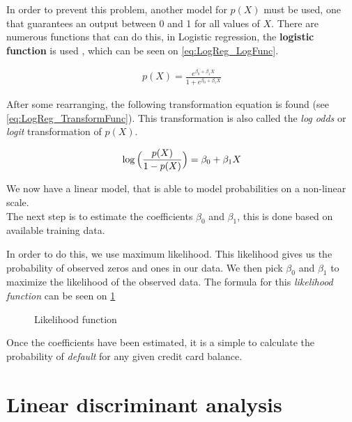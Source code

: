 In order to prevent this problem, another model for $p(X)$ must be used, one that guarantees an output between 0 and 1 for all values of $X$. There are numerous functions that can do this, in Logistic regression, the \textbf{logistic function} is used , which can be seen on \cref{eq:LogReg_LogFunc}.

\begin{equation} \label{eq:LogReg_LogFunc}
\begin{split}
p(X)=\frac{e^{\beta_0 + \beta_1 X}}{1+e^{\beta_0 + \beta_1 X}}
\end{split}
\end{equation}

After some rearranging, the following transformation equation is found (see \cref{eq:LogReg_TransformFunc}). This transformation is also called the \textit{log odds} or \textit{logit} transformation of $p(X)$.

\begin{equation} \label{eq:LogReg_TransformFunc}
\begin{split}
\log{\Bigl(\frac{p(X)}{1-p(X)}\Bigr)}= \beta_0+ \beta_1 X
\end{split}
\end{equation}

We now have a linear model, that is able to model probabilities on a non-linear scale.\\
The next step is to estimate the coefficients $\beta_0$ and $\beta_1$, this is done based on available training data.

In order to do this, we use maximum likelihood. This likelihood gives us the probability of observed zeros and ones in our data. We then pick $\beta_0$ and $\beta_1$ to maximize the likelihood of the observed data. The formula for this \textit{likelihood function} can be seen on \cref{fig:maximum_likelihood}

\begin{figure}[H]
	\centering
	\caption{Likelihood function}
	\label{fig:maximum_likelihood}
\end{figure}

Once the coefficients have been estimated, it is a simple to calculate the probability of \textit{default} for any given credit card balance.

\section{Linear discriminant analysis}

